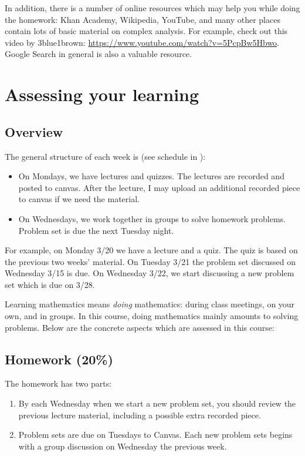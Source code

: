 \documentclass[oneside,11pt]{amsart}
\begin{document}
\medskip

In addition, there is a number of online resources which may help you while doing the homework:
Khan Academy, Wikipedia, YouTube, and many other 
places contain lots of basic material on complex analysis. 
For example, check out this video by 3blue1brown: \url{https://www.youtube.com/watch?v=5PcpBw5Hbwo}.
Google Search
in general
is also a valuable resource.

\section{Assessing your learning}

\subsection*{Overview}

The general structure of each week is (see schedule in ):
\begin{itemize}
	\item On Mondays, we have lectures and quizzes. 
	The lectures are recorded and posted to canvas. After the lecture, I may upload an 
	additional recorded piece to canvas if we need the material.
	\item On Wednesdays, we work together in groups to solve homework problems. Problem set is due the next Tuesday night.
\end{itemize}
For example, on Monday 3/20 we have a lecture and a quiz. The quiz is based on the previous two weeks' material. 
On Tuesday 3/21 the problem set discussed on Wednesday 3/15 is due.
On Wednesday 3/22, we start discussing a new problem set which is due on 3/28.

\medskip

Learning mathematics means \emph{doing} mathematics: during class meetings, on your own, and in groups. 
In this course, doing mathematics mainly amounts to solving problems.
Below are the concrete aspects which are assessed in this course:

\subsection{Homework (20\%)}

The homework has two parts:
\begin{enumerate}
	\item By each Wednesday when we start a new problem set, 
		you should review the previous lecture material, including a possible
		extra recorded piece.
	\item Problem sets are due on Tuesdays to Canvas. Each new problem sets begins with a group discussion
		on Wednesday the previous week.
\end{enumerate}
\end{document}
